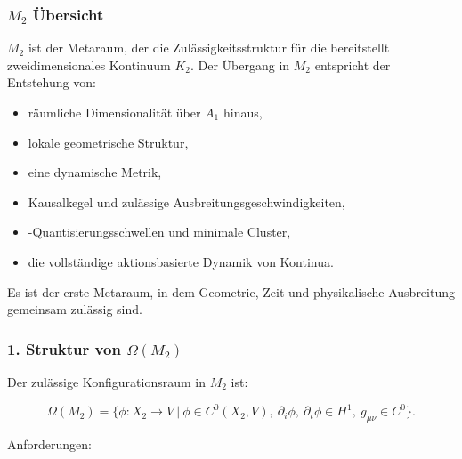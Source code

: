 

\subsubsection{\texorpdfstring{$M_2$}{M_2} Übersicht}
\label{sec:m2-overview}

$M_2$ ist der Metaraum, der die Zulässigkeitsstruktur für die bereitstellt
zweidimensionales Kontinuum $K_2$.
Der Übergang in $M_2$ entspricht der Entstehung von:

\begin{itemize}
    \item räumliche Dimensionalität über $A_1$ hinaus,
    \item lokale geometrische Struktur,
    \item eine dynamische Metrik,
    \item Kausalkegel und zulässige Ausbreitungsgeschwindigkeiten,
    \item-Quantisierungsschwellen und minimale Cluster,
    \item die vollständige aktionsbasierte Dynamik von Kontinua.
\end{itemize}

Es ist der erste Metaraum, in dem Geometrie, Zeit und physikalische Ausbreitung gemeinsam zulässig sind.

\subsubsection*{1. Struktur von \texorpdfstring{$\Omega(M_2)$}{\Omega(M_2)}}

Der zulässige Konfigurationsraum in $M_2$ ist:

\[
\Omega(M_2)
=
\Big\{
\phi : X_2 \to V \ \big|\
\phi \in C^{0}(X_2,V),\
\partial_i\phi,\ \partial_t\phi \in H^1,\
g_{\mu\nu} \in C^{0}
\Big\}.
\]

Anforderungen:

